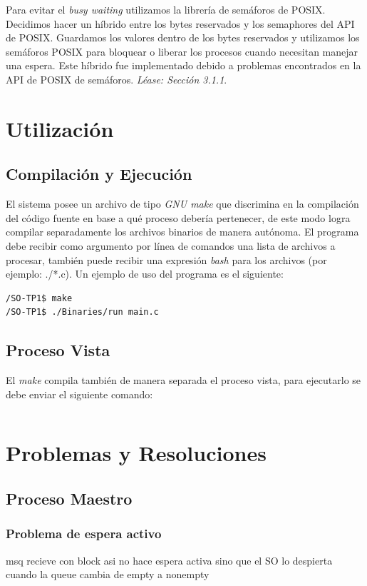 \documentclass[10pt,a4paper]{report}
\begin{document}
Para evitar el \textit{busy waiting} utilizamos la librería de semáforos de POSIX. Decidimos hacer un híbrido entre los bytes reservados y los semaphores del API de POSIX. Guardamos los valores dentro de los bytes reservados y utilizamos los semáforos POSIX para bloquear o liberar los procesos cuando necesitan manejar una espera. Este híbrido fue implementado debido a problemas encontrados en la API de POSIX de semáforos. \textit{Léase: Sección 3.1.1}.

\chapter{Utilización}
\section{Compilación y Ejecución}
El sistema posee un archivo de tipo \textit{GNU make} que discrimina en la compilación del código fuente en base a qué proceso debería pertenecer, de este modo logra compilar separadamente los archivos binarios de manera autónoma. El programa debe recibir como argumento por línea de comandos una lista de archivos a procesar, también puede recibir una expresión \textit{bash} para los archivos (por ejemplo: ./*.c). Un ejemplo de uso del programa es el siguiente:
\begin{lstlisting}
/SO-TP1$ make
/SO-TP1$ ./Binaries/run main.c
\end{lstlisting}


\section{Proceso Vista}
El \textit{make} compila también de manera separada el proceso vista, para ejecutarlo se debe enviar el siguiente comando:
\begin{lstlisting}
\end{lstlisting}


\chapter{Problemas y Resoluciones}
\section{Proceso Maestro}
\subsection{Problema de espera activo}
msq recieve con block asi no hace espera activa sino que el SO lo despierta cuando la queue cambia de empty a nonempty
\end{document}

